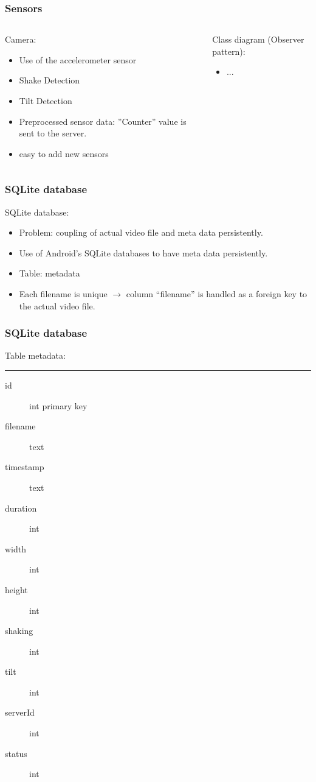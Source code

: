 \begin{frame}	
	\frametitle{Sensors}
	\begin{columns}[t]
		\begin{column}[t]{0.5\linewidth}
			Camera:
			\begin{itemize}
				\item Use of the accelerometer sensor
				\item Shake Detection
				\item Tilt Detection
				\item Preprocessed sensor data: ”Counter” value is sent to the server.
				\item easy to add new sensors
			\end{itemize}
		\end{column}
		\begin{column}[t]{0.5\linewidth}
			Class diagram (Observer pattern): 
			\begin{itemize}
				\item ...
			\end{itemize}
			
		\end{column}		
	\end{columns}	
\end{frame}

\begin{frame}	
	\frametitle{SQLite database}
	SQLite database:
		\begin{itemize}
			\item Problem: coupling of actual video file and meta data persistently. 
			\item Use of Android's SQLite databases to have meta data persistently.
			\item Table: metadata
			\item Each filename is unique $\rightarrow$ column ``filename'' is handled as a foreign key to the actual video file.
		\end{itemize}
\end{frame}

\begin{frame}	
	\frametitle{SQLite database}
		Table metadata: \hrule
		\begin{description}	
			\item[id] int primary key
			\item[filename] text
			\item[timestamp] text
			\item[duration] int
			\item[width] int
			\item[height] int
			\item[shaking] int
			\item[tilt] int
			\item[serverId] int
			\item[status] int
		\end{description}
\end{frame}

